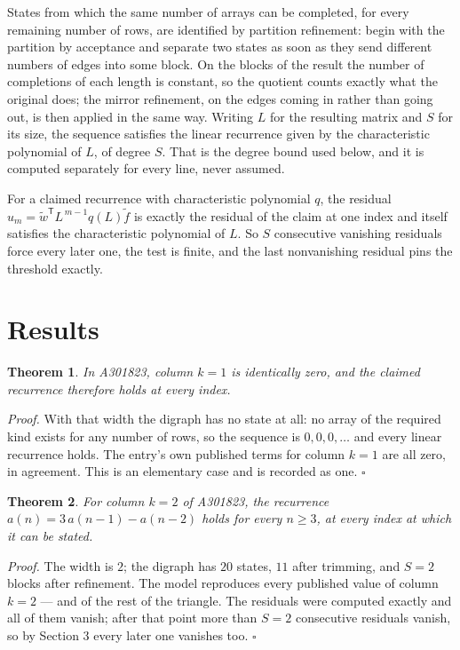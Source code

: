 \documentclass[11pt]{article}
\newtheorem{theorem}{Theorem}
\theoremstyle{definition}
\begin{document}
States from which the same number of arrays can be completed, for every remaining number of rows, are identified by partition refinement: begin with the partition by acceptance and separate two states as soon as they send different numbers of edges into some block. On the blocks of the result the number of completions of each length is constant, so the quotient counts exactly what the original does; the mirror refinement, on the edges coming in rather than going out, is then applied in the same way. Writing $L$ for the resulting matrix and $S$ for its size, the sequence satisfies the linear recurrence given by the characteristic polynomial of $L$, of degree $S$. That is the degree bound used below, and it is computed separately for every line, never assumed.

For a claimed recurrence with characteristic polynomial $q$, the residual $u_m = \tilde w^{\mathsf T}L^{\,m-1}q(L)\tilde f$ is exactly the residual of the claim at one index and itself satisfies the characteristic polynomial of $L$. So $S$ consecutive vanishing residuals force every later one, the test is finite, and the last nonvanishing residual pins the threshold exactly.

\section{Results}

\begin{theorem} In A301823, column $k = 1$ is identically zero, and the claimed recurrence therefore holds at every index.\end{theorem}

{\itshape Proof.} With that width the digraph has no state at all: no array of the required kind exists for any number of rows, so the sequence is $0,0,0,\dots$ and every linear recurrence holds. The entry's own published terms for column $k = 1$ are all zero, in agreement. This is an elementary case and is recorded as one. $\square$

\begin{theorem} For column $k = 2$ of A301823, the recurrence $a(n) = 3\,a(n-1) - a(n-2)$ holds for every $n \ge 3$, at every index at which it can be stated.\end{theorem}

{\itshape Proof.} The width is $2$; the digraph has $20$ states, $11$ after trimming, and $S = 2$ blocks after refinement. The model reproduces every published value of column $k = 2$ --- and of the rest of the triangle. The residuals were computed exactly and all of them vanish; after that point more than $S = 2$ consecutive residuals vanish, so by Section 3 every later one vanishes too. $\square$
\end{document}
